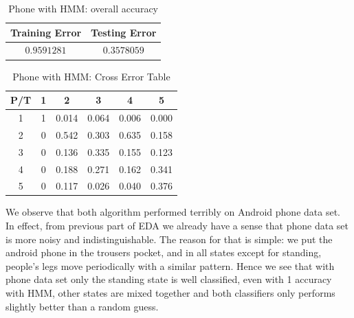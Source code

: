 \begin{itemize}
\begin{table}[!htb]
\begin{center}
\begin{tabular}{c|c}
      \hline
      Training Error & Testing Error\\
      \hline
      $0.9591281$ & $0.3578059$ \\
      \hline
\end{tabular}
\caption{Phone with HMM: overall accuracy}
\label{tab:phoneHMM1}
\end{center}
\end{table}
\begin{table}[!htb]
\begin{center}
\begin{tabular}{c|c|c|c|c|c}
      \hline
      P/T& 1 & 2 &3 & 4 & 5 \\
      \hline
      1 &1&0.014&0.064&0.006&0.000\\
      2 &0&0.542&0.303&0.635&0.158\\
      3 &0&0.136&0.335&0.155&0.123\\
      4 &0&0.188&0.271&0.162&0.341\\
      5 & 0&0.117&0.026&0.040&0.376\\
      \hline
\end{tabular}
\caption{Phone with HMM: Cross Error Table}
\label{tab:phoneHMM2}
\end{center}
\end{table}
\end{itemize}

We observe that both algorithm performed terribly on Android phone data set. In effect, from previous part of EDA we already have a sense that phone data set is more noisy and indistinguishable. The reason for that is simple: we put the android phone in the trousers pocket, and in all states except for standing, people's legs move periodically with a similar pattern. Hence we see that with phone data set only the standing state is well classified, even with 1 accuracy with HMM, other states are mixed together and both classifiers only performs slightly better than a random guess. 

